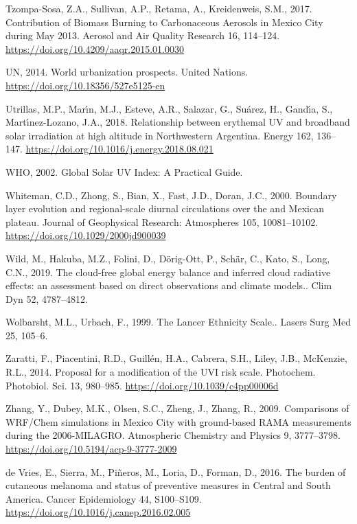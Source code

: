 \documentclass[10pt]{article}
\begin{document}
\label{csl:5}Tzompa-Sosa, Z.A., Sullivan, A.P., Retama, A., Kreidenweis, S.M., 2017. {Contribution of Biomass Burning to Carbonaceous Aerosols in Mexico City during May 2013}. Aerosol and Air Quality Research 16, 114–124. \url{https://doi.org/10.4209/aaqr.2015.01.0030}

\label{csl:1}UN, 2014. {World urbanization prospects}. United Nations. \url{https://doi.org/10.18356/527e5125-en}

\label{csl:58}Utrillas, M.P., Mar{\'{\i}}n, M.J., Esteve, A.R., Salazar, G., Su{\'{a}}rez, H., Gand{\'{\i}}a, S., Mart{\'{\i}}nez-Lozano, J.A., 2018. {Relationship between erythemal {UV} and broadband solar irradiation at high altitude in Northwestern Argentina}. Energy 162, 136–147. \url{https://doi.org/10.1016/j.energy.2018.08.021}

\label{csl:24}WHO, 2002. {Global Solar UV Index: A Practical Guide}.

\label{csl:6}Whiteman, C.D., Zhong, S., Bian, X., Fast, J.D., Doran, J.C., 2000. {Boundary layer evolution and regional-scale diurnal circulations over the and Mexican plateau}. Journal of Geophysical Research: Atmospheres 105, 10081–10102. \url{https://doi.org/10.1029/2000jd900039}

\label{csl:68}Wild, M., Hakuba, M.Z., Folini, D., Dörig-Ott, P., Schär, C., Kato, S., Long, C.N., 2019. {The cloud-free global energy balance and inferred cloud radiative effects: an assessment based on direct observations and climate models.}. Clim Dyn 52, 4787–4812.

\label{csl:44}Wolbarsht, M.L., Urbach, F., 1999. {The Lancer Ethnicity Scale.}. Lasers Surg Med 25, 105–6.

\label{csl:26}Zaratti, F., Piacentini, R.D., Guill{\'{e}}n, H.A., Cabrera, S.H., Liley, J.B., McKenzie, R.L., 2014. {Proposal for a modification of the {UVI} risk scale}. Photochem. Photobiol. Sci. 13, 980–985. \url{https://doi.org/10.1039/c4pp00006d}

\label{csl:8}Zhang, Y., Dubey, M.K., Olsen, S.C., Zheng, J., Zhang, R., 2009. {Comparisons of {WRF}/Chem simulations in Mexico City with ground-based {RAMA} measurements during the 2006-{MILAGRO}}. Atmospheric Chemistry and Physics 9, 3777–3798. \url{https://doi.org/10.5194/acp-9-3777-2009}

\label{csl:38}de Vries, E., Sierra, M., Pi{\~{n}}eros, M., Loria, D., Forman, D., 2016. {The burden of cutaneous melanoma and status of preventive measures in Central and South America}. Cancer Epidemiology 44, S100–S109. \url{https://doi.org/10.1016/j.canep.2016.02.005}
\end{document}
